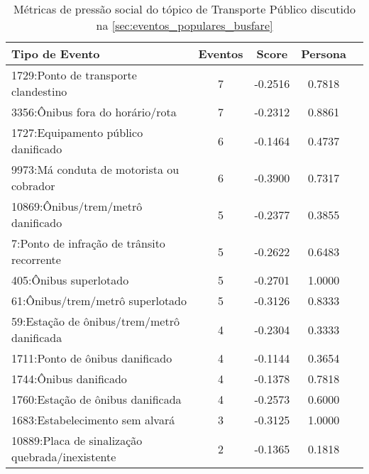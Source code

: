 \begin{table}[htbp]
	\centering
	\caption{Métricas de pressão social do tópico de Transporte Público discutido na \autoref{sec:eventos_populares_busfare}}
	\label{tab:eventos_populares_busfare}
	\begin{tabular}{|l|c|c|c|c|}
		\hline
		\textbf{Tipo de Evento}                              & \textbf{Eventos} & \textbf{Score} & \textbf{Persona} \\
		\hline
		1729:Ponto de transporte clandestino                 & 7                & -0.2516        & 0.7818           \\
		\hline
		3356:Ônibus fora do horário/rota                     & 7                & -0.2312        & 0.8861           \\
		\hline
		1727:Equipamento público danificado                  & 6                & -0.1464        & 0.4737           \\
		\hline
		9973:Má conduta de motorista ou cobrador             & 6                & -0.3900        & 0.7317           \\
		\hline
		10869:Ônibus/trem/metrô danificado                   & 5                & -0.2377        & 0.3855           \\
		\hline
		7:Ponto de infração de trânsito recorrente           & 5                & -0.2622        & 0.6483           \\
		\hline
		405:Ônibus superlotado                               & 5                & -0.2701        & 1.0000           \\
		\hline
		61:Ônibus/trem/metrô superlotado                     & 5                & -0.3126        & 0.8333           \\
		\hline
		59:Estação de ônibus/trem/metrô danificada           & 4                & -0.2304        & 0.3333           \\
		\hline
		1711:Ponto de ônibus danificado                      & 4                & -0.1144        & 0.3654           \\
		\hline
		1744:Ônibus danificado                               & 4                & -0.1378        & 0.7818           \\
		\hline
		1760:Estação de ônibus danificada                    & 4                & -0.2573        & 0.6000           \\
		\hline
		1683:Estabelecimento sem alvará                      & 3                & -0.3125        & 1.0000           \\
		\hline
		10889:Placa de sinalização quebrada/inexistente      & 2                & -0.1365        & 0.1818           \\

\end{tabular}
\end{table}
